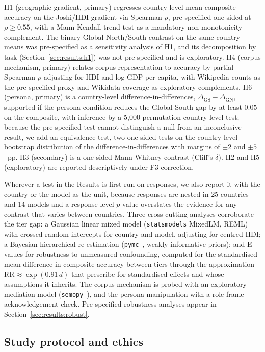 H1 (geographic gradient, primary) regresses country-level mean composite
accuracy on the Joshi/HDI gradient via Spearman $\rho$, pre-specified one-sided
at $\rho\geq0.55$, with a Mann-Kendall trend test as a mandatory
non-monotonicity complement. The binary Global North/South contrast on the same
country means was pre-specified as a sensitivity analysis of H1, and its
decomposition by task (Section~\ref{sec:results:h1}) was not pre-specified and
is exploratory. H4 (corpus mechanism, primary) relates corpus representation to
accuracy by partial Spearman $\rho$ adjusting for HDI and log GDP per capita,
with Wikipedia counts as the pre-specified proxy and Wikidata coverage as
exploratory complements. H6 (persona, primary) is a country-level
difference-in-differences, $\Delta_{\mathrm{GS}}-\Delta_{\mathrm{GN}}$,
supported if the persona condition reduces the Global South gap by at least
$0.05$ on the composite, with inference by a 5{,}000-permutation country-level
test; because the pre-specified test cannot distinguish a null from an
inconclusive result, we add an equivalence test, two one-sided tests on the
country-level bootstrap distribution of the difference-in-differences with
margins of $\pm2$ and $\pm5$~pp. H3 (secondary) is a one-sided Mann-Whitney
contrast (Cliff's $\delta$). H2 and H5 (exploratory) are reported descriptively
under F3 correction.

Wherever a test in the Results is first run on responses, we also report it
with the country or the model as the unit, because responses are nested in 25
countries and 14 models and a response-level $p$-value overstates the evidence
for any contrast that varies between countries. Three cross-cutting analyses
corroborate the tier gap: a Gaussian linear mixed model (\texttt{statsmodels}
MixedLM, REML) with crossed random intercepts for country and model, adjusting
for centred HDI; a Bayesian hierarchical re-estimation
(\texttt{pymc}~\citep{pymc}, weakly informative priors); and E-values for
robustness to unmeasured confounding, computed for the standardised mean
difference in composite accuracy between tiers through the approximation
$\mathrm{RR}\approx\exp(0.91\,d)$ that \citet{vanderweele2017evalue} prescribe
for standardised effects and whose assumptions it inherits. The corpus
mechanism is probed with an exploratory mediation model
(\texttt{semopy}~\citep{semopy}), and the persona manipulation with a
role-frame-acknowledgement check. Pre-specified robustness analyses appear in
Section~\ref{sec:results:robust}.

\subsection{Study protocol and ethics}

